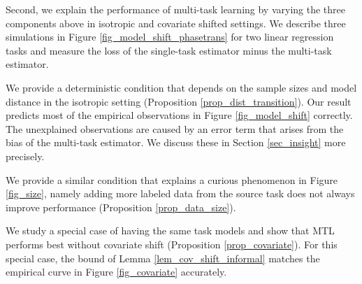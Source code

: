 Second, we explain the performance of multi-task learning by varying the three components above in isotropic and covariate shifted settings.
We describe three simulations in Figure \ref{fig_model_shift_phasetrans} for two linear regression tasks and measure the loss of the single-task estimator minus the multi-task estimator.
\squishlist
	\item We provide a deterministic condition that depends on the sample sizes and model distance in the isotropic setting (Proposition \ref{prop_dist_transition}).
	Our result predicts most of the empirical observations in Figure \ref{fig_model_shift} correctly.
	The unexplained observations are caused by an error term that arises from the bias of the multi-task estimator.
	We discuss these in Section \ref{sec_insight} more precisely.
	\item We provide a similar condition that explains a curious phenomenon in Figure \ref{fig_size}, namely adding more labeled data from the source task does not always improve performance (Proposition \ref{prop_data_size}).
	\item We study a special case of having the same task models and show that MTL  performs best without covariate shift (Proposition \ref{prop_covariate}).
	For this special case, the bound of Lemma \ref{lem_cov_shift_informal} matches the empirical curve in Figure \ref{fig_covariate} accurately.
\squishend
